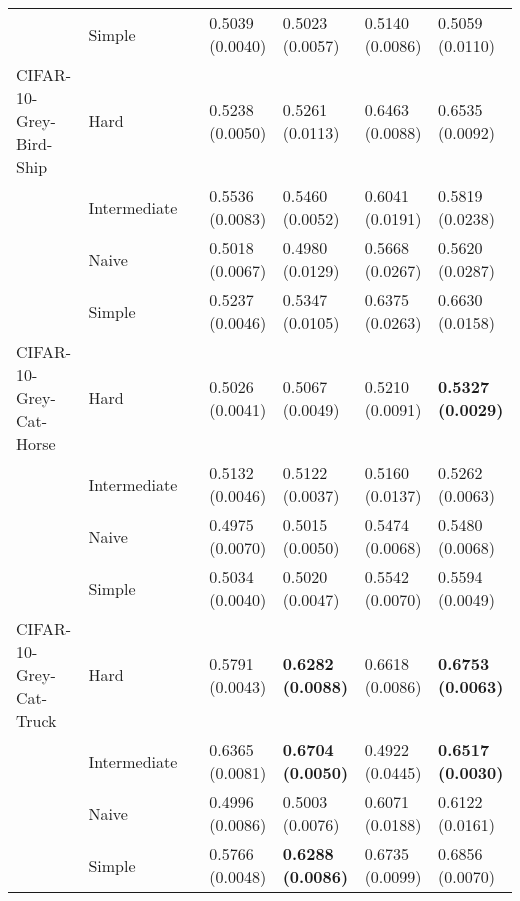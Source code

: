 \begin{tabular}{lllllll}
                 & Simple &                  &           0.5039 (0.0040) &           0.5023 (0.0057) &           0.5140 (0.0086) &           0.5059 (0.0110) \\
CIFAR-10-Grey-Bird-Ship & Hard &                  &           0.5238 (0.0050) &           0.5261 (0.0113) &           0.6463 (0.0088) &           0.6535 (0.0092) \\
                 & Intermediate &                  &           0.5536 (0.0083) &           0.5460 (0.0052) &           0.6041 (0.0191) &           0.5819 (0.0238) \\
                 & Naive &                  &           0.5018 (0.0067) &           0.4980 (0.0129) &           0.5668 (0.0267) &           0.5620 (0.0287) \\
                 & Simple &                  &           0.5237 (0.0046) &           0.5347 (0.0105) &           0.6375 (0.0263) &           0.6630 (0.0158) \\
CIFAR-10-Grey-Cat-Horse & Hard &                  &           0.5026 (0.0041) &           0.5067 (0.0049) &           0.5210 (0.0091) &  \textbf{0.5327 (0.0029)} \\
                 & Intermediate &                  &           0.5132 (0.0046) &           0.5122 (0.0037) &           0.5160 (0.0137) &           0.5262 (0.0063) \\
                 & Naive &                  &           0.4975 (0.0070) &           0.5015 (0.0050) &           0.5474 (0.0068) &           0.5480 (0.0068) \\
                 & Simple &                  &           0.5034 (0.0040) &           0.5020 (0.0047) &           0.5542 (0.0070) &           0.5594 (0.0049) \\
CIFAR-10-Grey-Cat-Truck & Hard &                  &           0.5791 (0.0043) &  \textbf{0.6282 (0.0088)} &           0.6618 (0.0086) &  \textbf{0.6753 (0.0063)} \\
                 & Intermediate &                  &           0.6365 (0.0081) &  \textbf{0.6704 (0.0050)} &           0.4922 (0.0445) &  \textbf{0.6517 (0.0030)} \\
                 & Naive &                  &           0.4996 (0.0086) &           0.5003 (0.0076) &           0.6071 (0.0188) &           0.6122 (0.0161) \\
                 & Simple &                  &           0.5766 (0.0048) &  \textbf{0.6288 (0.0086)} &           0.6735 (0.0099) &           0.6856 (0.0070) \\

\end{tabular}
